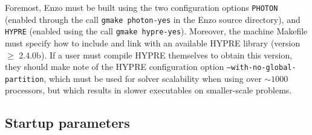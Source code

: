 \documentclass[letterpaper,10pt]{article}
\renewcommand{\(}{\left(}
\renewcommand{\)}{\right)}
\begin{document}
Foremost, Enzo must be built using the two configuration options
{\tt PHOTON} (enabled through the call {\tt gmake photon-yes} in the
Enzo source directory), and {\tt HYPRE} (enabled using the call 
{\tt gmake hypre-yes}).  Moreover, the machine Makefile must specify
how to include and link with an available HYPRE library (version $\ge$
2.4.0b).  If a user must compile HYPRE themselves to obtain this
version, they should make note of the HYPRE configuration option
{\tt --with-no-global-partition}, which must be used for solver
scalability when using over $\sim\!1000$ processors, but which results
in slower executables on smaller-scale problems.


\subsection{Startup parameters}
\end{document}
